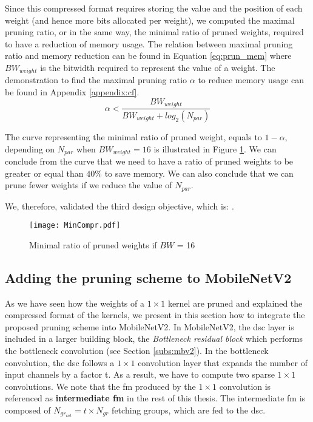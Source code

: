 Since this compressed format requires storing the value and the position of each weight (and hence more bits allocated per weight), we computed the maximal pruning ratio, or in the same way, the minimal ratio of pruned weights, required to have a reduction of memory usage. The relation between maximal pruning ratio and memory reduction can be found in Equation \eqref{eq:prun_mem} where $BW_{weight}$ is the bitwidth required to represent the value of a weight. The demonstration to find the maximal pruning ratio $\alpha$ to reduce memory usage can be found in Appendix \ref{appendix:cf}.
%
\begin{equation}
    \alpha < \frac{BW_{weight}}{ BW_{weight} + log_2(N_{par})}
    \label{eq:prun_mem}
\end{equation}

The curve representing the minimal ratio of pruned weight, equals to $1 - \alpha$, depending on $N_{par}$ when $BW_{weight} = 16$ is illustrated in Figure \ref{fig:prun_mem}. We can conclude from the curve that we need to have a ratio of pruned weights to be greater or equal than $40\%$ to save memory. We can also conclude that we can prune fewer weights if we reduce the value of $N_{par}$. 

We, therefore, validated the third design objective, which is: \textbf{}.
%
\begin{figure}[H]
    \centering
    \texttt{[image: MinCompr.pdf]}
    \caption{Minimal ratio of pruned weights if $BW$ = 16}
    \label{fig:prun_mem}
\end{figure}
%
\subsection{Adding the pruning scheme to MobileNetV2} \label{subsec:mbnv2-pr}
%
As we have seen how the weights of a $1 \times 1$ kernel are pruned and explained the compressed format of the kernels, we present in this section how to integrate the proposed pruning scheme into MobileNetV2. In MobileNetV2, the \acrshort{dsc} layer is included in a larger building block, the \textit{Bottleneck residual block} which performs the bottleneck convolution (see Section \ref{subs:mbv2}). In the bottleneck convolution, the \acrshort{dsc} follows a $1 \times 1$ convolution layer that expands the number of input channels by a factor t. As a result, we have to compute two sparse $1 \times 1$ convolutions. We note that the \acrshort{fm} produced by the $1 \times 1$ convolution is referenced as \textbf{intermediate \acrshort{fm}} in the rest of this thesis. The intermediate \acrshort{fm} is composed of $N_{gr_{int}} = t \times N_{gr}$ fetching groups, which are fed to the \acrshort{dsc}.

